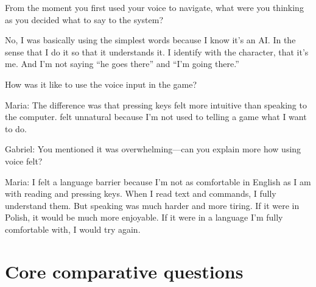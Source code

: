 \begin{QandA}


   \item From the moment you first used your voice to navigate, what were you thinking as you decided what to say to the system?

         \begin{answered}
            No, I was basically using the simplest words because I know it’s an AI.
            In the sense that I do it so that it understands it.
            I identify with the character, that it’s me.
            And I’m not saying “he goes there” and “I’m going there.”
         \end{answered}

    \item How was it like to use the voice input in the game?
         \begin{answered}
            Maria: The difference was that pressing keys felt more intuitive than speaking to the computer.
            felt unnatural because I’m not used to telling a game what I want to do.

            Gabriel: You mentioned it was overwhelming—can you explain more how using voice felt?

            Maria: I felt a language barrier because I’m not as comfortable in English as I am with reading and pressing keys.
            When I read text and commands, I fully understand them.
            But speaking was much harder and more tiring.
            If it were in Polish, it would be much more enjoyable.
            If it were in a language I’m fully comfortable with, I would try again.

         \end{answered}


\end{QandA}




\section{Core comparative questions}

